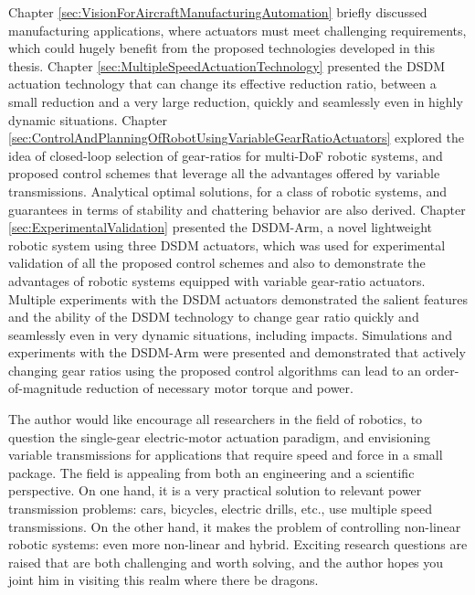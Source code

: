 %
Chapter \ref{sec:VisionForAircraftManufacturingAutomation} briefly discussed manufacturing applications, where actuators must meet challenging requirements, which could hugely benefit from the proposed technologies developed in this thesis. 
%
Chapter \ref{sec:MultipleSpeedActuationTechnology} presented the DSDM actuation technology that can change its effective reduction ratio, between a small reduction and a very large reduction, quickly and seamlessly even in highly dynamic situations. 
%
Chapter \ref{sec:ControlAndPlanningOfRobotUsingVariableGearRatioActuators} explored the idea of closed-loop selection of gear-ratios for multi-DoF robotic systems, and proposed control schemes that leverage all the advantages offered by variable transmissions. Analytical optimal solutions, for a class of robotic systems, and guarantees in terms of stability and chattering behavior are also derived.
%
Chapter \ref{sec:ExperimentalValidation} presented the DSDM-Arm, a novel lightweight robotic system using three DSDM actuators, which was used for experimental validation of all the proposed control schemes and also to demonstrate the advantages of robotic systems equipped with variable gear-ratio actuators.
%
Multiple experiments with the DSDM actuators demonstrated the salient features and the ability of the DSDM technology to change gear ratio quickly and seamlessly even in very dynamic situations, including impacts. Simulations and experiments with the DSDM-Arm were presented and demonstrated that actively changing gear ratios using the proposed control algorithms can lead to an order-of-magnitude reduction of necessary motor torque and power.

The author would like encourage all researchers in the field of robotics, to question the single-gear electric-motor actuation paradigm, and envisioning variable transmissions for applications that require speed and force in a small package. The field is appealing from both an engineering and a scientific perspective. On one hand, it is a very practical solution to relevant power transmission problems: cars, bicycles, electric drills, etc., use multiple speed transmissions. On the other hand, it makes the problem of controlling non-linear robotic systems: even more non-linear and hybrid. Exciting research questions are raised that are both challenging and worth solving, and the author hopes you joint him in visiting this realm where there be dragons.






